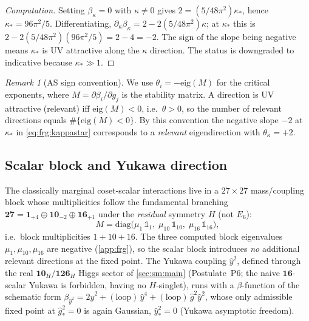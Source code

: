 \documentclass[11pt]{article}
\theoremstyle{plain}
\theoremstyle{definition}
\theoremstyle{remark}
\newtheorem{remark}[theorem]{Remark}
\begin{document}
\begin{proof}[Computation]
Setting $\beta_{\kappa}=0$ with $\kappa\neq0$ gives
$2=(5/48\pi^{2})\kappa_{\ast}$, hence $\kappa_{\ast}=96\pi^{2}/5$.
Differentiating, $\partial_{\kappa}\beta_{\kappa}=2-2(5/48\pi^{2})\kappa$;
at $\kappa_{\ast}$ this is $2-2(5/48\pi^{2})(96\pi^{2}/5)=2-4=-2$. The
sign of the slope being negative means $\kappa_{\ast}$ is UV attractive
along the $\kappa$ direction. The status is downgraded to indicative
because $\kappa_{\ast}\gg1$. \qedhere
\end{proof}

\begin{remark}[AS sign convention]
\label{rem:frg:convention}
We use $\theta_{i}=-\mathrm{eig}(M)$ for the critical exponents, where
$M=\partial\beta_{i}/\partial g_{j}$ is the stability matrix. A direction
is UV attractive (relevant) iff $\mathrm{eig}(M)<0$, i.e.\ $\theta>0$, so
the number of relevant directions equals $\#\{\mathrm{eig}(M)<0\}$. By this
convention the negative slope $-2$ at $\kappa_{\ast}$ in
\eqref{eq:frg:kappastar} corresponds to a \emph{relevant} eigendirection
with $\theta_{\kappa}=+2$.
\end{remark}

\subsection{Scalar block and Yukawa direction}
\label{sec:frg:scalar}

The classically marginal coset-scalar interactions live in a $27\times27$
mass/coupling block whose multiplicities follow the fundamental branching
$\mathbf{27}=\mathbf{1}_{+4}\oplus\mathbf{10}_{-2}\oplus\mathbf{16}_{+1}$
under the \emph{residual} symmetry $H$ (not $E_{6}$):
\begin{equation}\label{eq:frg:27block}
  M=\mathrm{diag}\bigl(\mu_{1}\,\mathbb{1}_{1},\;
                       \mu_{10}\,\mathbb{1}_{10},\;
                       \mu_{16}\,\mathbb{1}_{16}\bigr),
\end{equation}
i.e.\ block multiplicities $1+10+16$. The three computed block eigenvalues
$\mu_{1},\mu_{10},\mu_{16}$ are negative (\autoref{app:frg}), so the scalar
block introduces \emph{no} additional relevant directions at the fixed
point. The Yukawa coupling $\hat y^{2}$, defined through the real
$\mathbf{10}_{H}/\mathbf{126}_{H}$ Higgs sector of \autoref{sec:sm:main} (Postulate~P6;
the naive $\mathbf{16}$-scalar Yukawa is forbidden, having no $H$-singlet),
runs with a $\beta$-function of the schematic form
$\beta_{\hat y^{2}}=2\hat y^{2}+(\text{loop})\,\hat y^{4}+(\text{loop})\,\hat g^{2}\hat y^{2}$,
whose only admissible fixed point at $\hat g^{2}_{\ast}=0$ is again Gaussian,
$\hat y^{2}_{\ast}=0$ (Yukawa asymptotic freedom).
\end{document}

